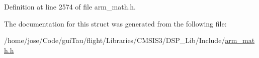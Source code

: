 Definition at line 2574 of file arm\-\_\-math.\-h.



The documentation for this struct was generated from the following file\-:\begin{DoxyCompactItemize}
\item 
/home/jose/\-Code/gui\-Tau/flight/\-Libraries/\-C\-M\-S\-I\-S3/\-D\-S\-P\-\_\-\-Lib/\-Include/\hyperlink{arm__math_8h}{arm\-\_\-math.\-h}\end{DoxyCompactItemize}

